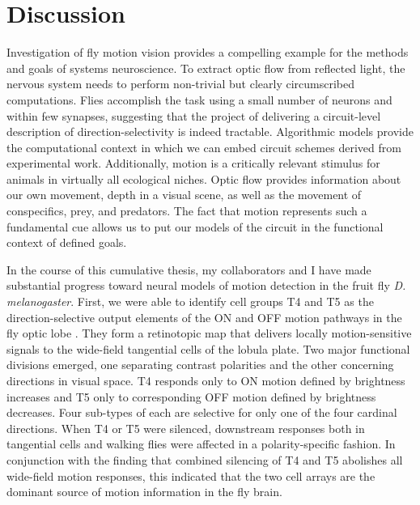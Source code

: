 \chapter{Discussion}
\label{chp:discussion}

Investigation of fly motion vision provides a compelling example for the methods and goals of systems neuroscience. To extract optic flow from reflected light, the nervous system needs to perform non-trivial but clearly circumscribed computations. Flies accomplish the task using a small number of neurons and within few synapses, suggesting that the project of delivering a circuit-level description of direction-selectivity is indeed tractable. Algorithmic models provide the computational context in which we can embed circuit schemes derived from experimental work. Additionally, motion is a critically relevant stimulus for animals in virtually all ecological niches. Optic flow provides information about our own movement, depth in a visual scene, as well as the movement of conspecifics, prey, and predators. The fact that motion represents such a fundamental cue allows us to put our models of the circuit in the functional context of defined goals.

In the course of this cumulative thesis, my collaborators and I have made substantial progress toward neural models of motion detection in the fruit fly \textit{D. melanogaster}. First, we were able to identify cell groups T4 and T5 as the direction-selective output elements of the ON and OFF motion pathways in the fly optic lobe \citep{Maisak:2013kk}. They form a retinotopic map that delivers locally motion-sensitive signals to the wide-field tangential cells of the lobula plate. Two major functional divisions emerged, one separating contrast polarities and the other concerning directions in visual space. T4 responds only to ON motion defined by brightness increases and T5 only to corresponding OFF motion defined by brightness decreases. Four sub-types of each are selective for only one of the four cardinal directions. When T4 or T5 were silenced, downstream responses both in tangential cells and walking flies were affected in a polarity-specific fashion. In conjunction with the finding that combined silencing of T4 and T5 abolishes all wide-field motion responses, this indicated that the two cell arrays are the dominant source of motion information in the fly brain.

